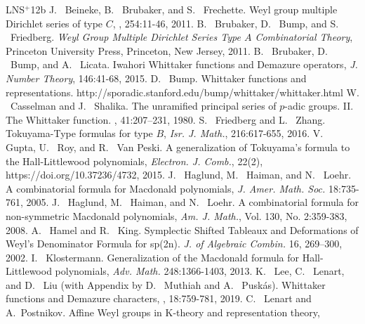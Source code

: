 \documentclass[11pt]{amsart}
\begin{document}
{

\newcommand{\etalchar}[1]{$^{#1}$}
\begin{thebibliography}{LNS{\etalchar{+}}12b}
J.~ Beineke, B. ~Brubaker, and S. ~Frechette.
\newblock Weyl group multiple Dirichlet series of type $C$,
, 254:11-46, 2011.
B.~ Brubaker, D.~ Bump, and S. ~Friedberg.
\newblock \emph{Weyl Group Multiple Dirichlet Series Type $A$ Combinatorial Theory},
\newblock Princeton University Press, Princeton, New Jersey, 2011.
B. ~Brubaker, D. ~Bump, and A. ~Licata.
\newblock Iwahori Whittaker functions and Demazure operators,
\newblock \emph{J. Number Theory}, 146:41-68, 2015.
D.~ Bump.
\newblock Whittaker functions and representations. \newline
\newblock http://sporadic.stanford.edu/bump/whittaker/whittaker.html
W. ~Casselman and J. ~Shalika.
\newblock The unramified principal series of {$p$}-adic groups. {II}. {T}he
{W}hittaker function.
, 41:207--231, 1980.
S.~ Friedberg and L. ~Zhang.
\newblock Tokuyama-Type formulas for type $B$,
\newblock \emph{Isr. J. Math.}, 216:617-655, 2016.
V.~ Gupta, U. ~Roy, and R. ~Van Peski.
\newblock A generalization of Tokuyama's formula to the Hall-Littlewood polynomials,
\newblock \emph{Electron. J. Comb.}, 22(2), https://doi.org/10.37236/4732, 2015.
J. ~Haglund, M. ~Haiman, and N. ~Loehr.
\newblock A combinatorial formula for Macdonald polynomials,
\newblock \emph{J. Amer. Math. Soc.} 18:735-761,
2005.
J.~ Haglund, M. ~Haiman, and N.~ Loehr.
\newblock A combinatorial formula for non-symmetric Macdonald polynomials,
\newblock\emph{Am. J. Math.}, Vol. 130, No. 2:359-383, 2008.
A.~ Hamel and R. ~King.
\newblock Symplectic Shifted Tableaux and Deformations of Weyl's Denominator Formula for sp(2n). 
\newblock\emph{J. of Algebraic Combin.} 16, 269–300, 2002.
I. ~Klostermann.
\newblock Generalization of the Macdonald formula for Hall-Littlewood polynomials,
\newblock \emph{Adv. Math.} 248:1366-1403, 2013.
K. ~Lee, C. ~Lenart, and D. ~Liu (with Appendix by D.~ Muthiah and A. ~Pusk\'{a}s).
\newblock Whittaker functions and Demazure characters,
, 18:759-781, 2019.
C.~ Lenart and A.~Postnikov.
\newblock Affine Weyl groups in K-theory and representation theory,

\end{thebibliography}}
\end{document}
